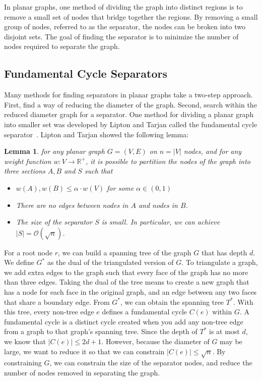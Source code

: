 \documentclass[11pt]{article}
\newtheorem{lemma}[theorem]{Lemma}
\begin{document}
In planar graphs, one method of dividing the graph into distinct regions is to remove a small set of nodes that bridge together the regions. By removing a small group of nodes, referred to as the separator, the nodes can be broken into two disjoint sets. The goal of finding the separator is to minimize the number of nodes required to separate the graph.

\subsection{Fundamental Cycle Separators}
\label{sec:graph-sep-fund-cycle-sep}

Many methods for finding separators in planar graphs take a two-step approach. First, find a way of reducing the diameter of the graph. Second, search within the reduced diameter graph for a separator. One method for dividing a planar graph into smaller set was developed by Lipton and Tarjan called the fundamental cycle separator~\cite{lipton1979separator}. Lipton and Tarjan showed the following lemma: \\

\begin{lemma}
    \label{lemma:separator}
    for any planar graph $G = (V,E)$ on $n = |V|$ nodes, and for any weight function $w: V \rightarrow \mathbb{R}^+$, it is possible to partition the nodes of the graph into three sections $A, B$ and $S$ such that
    \begin{itemize}
        \item $w(A), w(B) \leq \alpha \cdot w(V)$ for some $\alpha \in (0,1)$

        \item There are no edges between nodes in $A$ and nodes in $B$.

        \item The size of the separator $S$ is small. In particular, we can achieve $|S| = \mathcal{O}(\sqrt{n})$.
    \end{itemize}
\end{lemma}

For a root node $r$, we can build a spanning tree of the graph $G$ that has depth $d$. We define $G^*$ as the dual of the triangulated version of $G$. To triangulate a graph, we add extra edges to the graph such that every face of the graph has no more than three edges. Taking the dual of the tree means to create a new graph that has a node for each face in the original graph, and an edge between any two faces that share a boundary edge. From $G^*$, we can obtain the spanning tree $T^*$. With this tree, every non-tree edge $e$ defines a fundamental cycle $C(e)$ within $G$. A fundamental cycle is a distinct cycle created when you add any non-tree edge from a graph to that graph's spanning tree. Since the depth of $T^*$ is at most $d$, we know that $|C(e)| \leq 2d + 1$. However, because the diameter of $G$ may be large, we want to reduce it so that we can constrain $|C(e)| \leq \sqrt{n}$. By constraining $G$, we can constrain the size of the separator nodes, and reduce the number of nodes removed in separating the graph.
\end{document}
